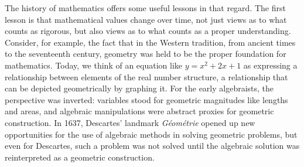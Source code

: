 \documentclass[12pt]{amsart}
\theoremstyle{definition}
\theoremstyle{remark}
\numberwithin{equation}{section}
\begin{document}
The history of mathematics offers some useful lessons in that regard. The first lesson is that mathematical values change over time, not just views as to what counts as rigorous, but also views as to what counts as a proper understanding. Consider, for example, the fact that in the Western tradition, from ancient times to the seventeenth century, geometry was held to be the proper foundation for mathematics. Today, we think of an equation like $y = x^2 + 2 x + 1$ as expressing a relationship between elements of the real number structure, a relationship that can be depicted geometrically by graphing it. For the early algebraists, the perspective was inverted: variables stood for geometric magnitudes like lengths and areas, and algebraic manipulations were abstract proxies for geometric construction. In 1637, Descartes' landmark \emph{G\'eom\'etrie} opened up new opportunities for the use of algebraic methods in solving geometric problems, but even for Descartes, such a problem was not solved until the algebraic solution was reinterpreted as a geometric construction.
\end{document}

